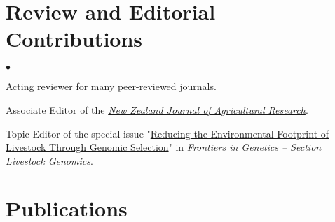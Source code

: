 \documentclass[margin,line]{res}
\newenvironment{list2}{
  \begin{list}{$\bullet$}{%
      \setlength{\itemsep}{0in}
      \setlength{\parsep}{0in} \setlength{\parskip}{0in}
      \setlength{\topsep}{0in} \setlength{\partopsep}{0in}
      \setlength{\leftmargin}{0.2in}}}{\end{list}}
\begin{document}
\begin{resume}
  \section{\sc Review and Editorial Contributions}

  \begin{list2}
    \item Acting reviewer for many peer-reviewed journals.
    \item Associate Editor of the \textit{\href{https://www.tandfonline.com/journals/tnza20}{New Zealand Journal of Agricultural Research}}.
    \item Topic Editor of the special issue "\href{https://www.frontiersin.org/research-topics/24065/reducing-the-environmental-footprint-of-livestock-through-genomic-selection}{Reducing the Environmental Footprint of Livestock Through Genomic Selection}" in \textit{Frontiers in Genetics -- Section Livestock Genomics}.
  \end{list2}
  \section{\sc Publications}


\end{resume}
\end{document}
